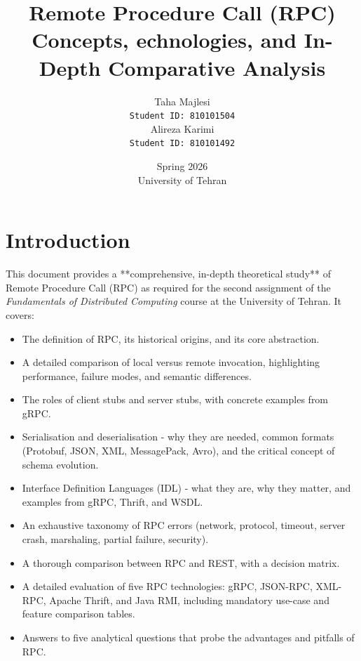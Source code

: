 \documentclass[a4paper]{article}
\title{\vspace{2cm} \textbf{Remote Procedure Call (RPC)} \\[0.5cm] \Large Concepts, echnologies, and In-Depth Comparative Analysis \\[1cm]}
\author{Taha Majlesi \\ \texttt{Student ID: 810101504} \\[0.5cm]
Alireza Karimi \\ \texttt{Student ID: 810101492}}
\date{Spring 2026 \\ University of Tehran}
\begin{document}
\maketitle
\thispagestyle{empty}
\newpage

\tableofcontents
\newpage

































\section{Introduction}
This document provides a **comprehensive, in-depth theoretical study** of Remote Procedure Call (RPC) as required for the second assignment of the \textit{Fundamentals of Distributed Computing} course at the University of Tehran. It covers:

\begin{itemize}
    \item The definition of RPC, its historical origins, and its core abstraction.
    \item A detailed comparison of local versus remote invocation, highlighting performance, failure modes, and semantic differences.
    \item The roles of client stubs and server stubs, with concrete examples from gRPC.
    \item Serialisation and deserialisation - why they are needed, common formats (Protobuf, JSON, XML, MessagePack, Avro), and the critical concept of schema evolution.
    \item Interface Definition Languages (IDL) - what they are, why they matter, and examples from gRPC, Thrift, and WSDL.
    \item An exhaustive taxonomy of RPC errors (network, protocol, timeout, server crash, marshaling, partial failure, security).
    \item A thorough comparison between RPC and REST, with a decision matrix.
    \item A detailed evaluation of five RPC technologies: gRPC, JSON-RPC, XML-RPC, Apache Thrift, and Java RMI, including mandatory use-case and feature comparison tables.
    \item Answers to five analytical questions that probe the advantages and pitfalls of RPC.
\end{itemize}
\end{document}
